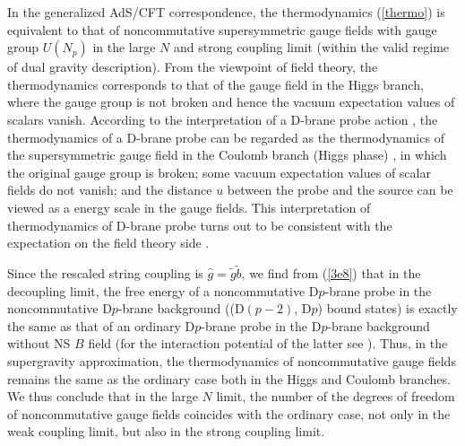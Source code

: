 \documentclass[a4paper,12pt]{article}
\begin{document}
In the generalized AdS/CFT correspondence, the thermodynamics (\ref{thermo})
is equivalent to that of noncommutative supersymmetric gauge fields
with gauge group $U(N_p)$ in the large $N$ and strong coupling limit (within
the valid regime of dual gravity description). From the viewpoint of field
theory, the thermodynamics corresponds to that of the gauge field in the
Higgs branch, where the gauge group is not broken and hence the vacuum
expectation values of scalars vanish. According to the interpretation of
a D-brane probe action \cite{Mald3}, the thermodynamics of a D-brane probe
can be regarded as the thermodynamics of the supersymmetric gauge field
in the Coulomb branch (Higgs phase) \cite{AA,Kirit}, in which the original
gauge group is broken; some vacuum expectation values of scalar fields
do not vanish; and the distance $u$ between the probe and the source can
be viewed as a energy scale in the gauge fields. This interpretation of
thermodynamics of D-brane probe turns out to be consistent with
the expectation on the field theory side \cite{AA,Kirit}.

Since the rescaled string coupling is $\hat{g}=\tilde{g}\tilde{b}$,
we find from (\ref{3e8}) that in the decoupling limit, the free energy
of a noncommutative D$p$-brane probe in the noncommutative D$p$-brane
background ((D$(p-2)$, D$p$) bound states) is exactly the same as that of an
ordinary D$p$-brane probe in the D$p$-brane background without NS $B$ field
(for the interaction potential of the latter see \cite{Kirit}). Thus,
in the supergravity approximation, the thermodynamics of noncommutative
gauge fields remains the same as the ordinary case both in the Higgs and
Coulomb branches. We thus conclude that in the large $N$ limit, the number
of the degrees of freedom of noncommutative gauge fields coincides with
the ordinary case, not only in the weak coupling limit, but also in the
strong coupling limit.
\end{document}
